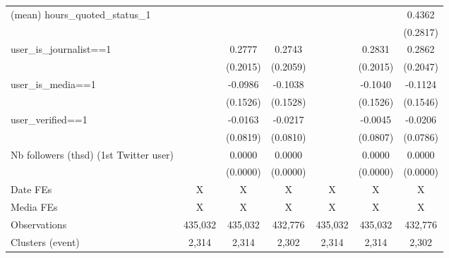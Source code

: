{\begin{tabular}{l*{6}{c}}
(mean) hours\_quoted\_status\_1&                     &                     &                     &                     &                     &      0.4362         \\
                    &                     &                     &                     &                     &                     &    (0.2817)         \\
user\_is\_journalist==1&                     &      0.2777         &      0.2743         &                     &      0.2831         &      0.2862         \\
                    &                     &    (0.2015)         &    (0.2059)         &                     &    (0.2015)         &    (0.2047)         \\
user\_is\_media==1    &                     &     -0.0986         &     -0.1038         &                     &     -0.1040         &     -0.1124         \\
                    &                     &    (0.1526)         &    (0.1528)         &                     &    (0.1526)         &    (0.1546)         \\
user\_verified==1    &                     &     -0.0163         &     -0.0217         &                     &     -0.0045         &     -0.0206         \\
                    &                     &    (0.0819)         &    (0.0810)         &                     &    (0.0807)         &    (0.0786)         \\
Nb followers (thsd) (1st Twitter user)&                     &      0.0000         &      0.0000         &                     &      0.0000         &      0.0000         \\
                    &                     &    (0.0000)         &    (0.0000)         &                     &    (0.0000)         &    (0.0000)         \\
\hline
Date FEs            &           X         &           X         &           X         &           X         &           X         &           X         \\
Media FEs           &           X         &           X         &           X         &           X         &           X         &           X         \\
Observations        &     435,032         &     435,032         &     432,776         &     435,032         &     435,032         &     432,776         \\
Clusters (event)    &       2,314         &       2,314         &       2,302         &       2,314         &       2,314         &       2,302         \\
\hline\hline
\end{tabular}
}
